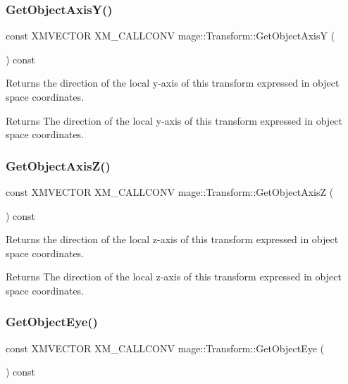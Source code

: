 \subsubsection{\texorpdfstring{Get\+Object\+Axis\+Y()}{GetObjectAxisY()}}
{\footnotesize\ttfamily const X\+M\+V\+E\+C\+T\+OR X\+M\+\_\+\+C\+A\+L\+L\+C\+O\+NV mage\+::\+Transform\+::\+Get\+Object\+AxisY (\begin{DoxyParamCaption}{ }\end{DoxyParamCaption}) const\hspace{0.3cm}{\ttfamily [noexcept]}}

Returns the direction of the local y-\/axis of this transform expressed in object space coordinates.

\begin{DoxyReturn}{Returns}
The direction of the local y-\/axis of this transform expressed in object space coordinates. 
\end{DoxyReturn}
\hypertarget{classmage_1_1_transform_a404fdd1491f8f35376a78f7bd96d09b2}{}\label{classmage_1_1_transform_a404fdd1491f8f35376a78f7bd96d09b2} 
\subsubsection{\texorpdfstring{Get\+Object\+Axis\+Z()}{GetObjectAxisZ()}}
{\footnotesize\ttfamily const X\+M\+V\+E\+C\+T\+OR X\+M\+\_\+\+C\+A\+L\+L\+C\+O\+NV mage\+::\+Transform\+::\+Get\+Object\+AxisZ (\begin{DoxyParamCaption}{ }\end{DoxyParamCaption}) const\hspace{0.3cm}{\ttfamily [noexcept]}}

Returns the direction of the local z-\/axis of this transform expressed in object space coordinates.

\begin{DoxyReturn}{Returns}
The direction of the local z-\/axis of this transform expressed in object space coordinates. 
\end{DoxyReturn}
\hypertarget{classmage_1_1_transform_a1c2046b7035842501352665dbde6ab0a}{}\label{classmage_1_1_transform_a1c2046b7035842501352665dbde6ab0a} 
\subsubsection{\texorpdfstring{Get\+Object\+Eye()}{GetObjectEye()}}
{\footnotesize\ttfamily const X\+M\+V\+E\+C\+T\+OR X\+M\+\_\+\+C\+A\+L\+L\+C\+O\+NV mage\+::\+Transform\+::\+Get\+Object\+Eye (\begin{DoxyParamCaption}{ }\end{DoxyParamCaption}) const\hspace{0.3cm}{\ttfamily [noexcept]}}

